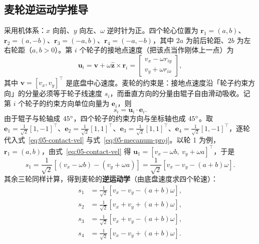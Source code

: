 \subsection{麦轮逆运动学推导}

采用机体系：$x$ 向前、$y$ 向左、$\omega$ 逆时针为正。四个轮心位置为 $\bm{r}_1=(a,b)$、$\bm{r}_2=(a,-b)$、$\bm{r}_3=(-a,b)$、$\bm{r}_4=(-a,-b)$，其中 $2a$ 为前后轮距、$2b$ 为左右轮距（$a,b>0$）。第 $i$ 个轮子的接地点速度（把该点当作刚体上一点）为
\begin{equation}
  \bm{u}_i = \bm{v}+\omega\hat{\bm{z}}\times\bm{r}_i
  = \begin{bmatrix}v_x-\omega r_{iy}\\ v_y+\omega r_{ix}\end{bmatrix},
  \label{eq:05-contact-vel}
\end{equation}
其中 $\bm{v}=[v_x,v_y]^{\top}$ 是底盘中心速度。麦轮的约束是：接地点速度沿「轮子约束方向」的分量必须等于轮子线速度 $s_i$，而垂直方向的分量由辊子自由滑动吸收。记第 $i$ 个轮子的约束方向单位向量为 $\bm{e}_i$，则
\begin{equation}
  s_i = \bm{u}_i\cdot\bm{e}_i.
  \label{eq:05-mecanum-proj}
\end{equation}
由于辊子与轮轴成 $45^\circ$，四个轮子的约束方向与坐标轴也成 $45^\circ$。取 $\bm{e}_1=\frac{1}{\sqrt2}[1,-1]^{\top}$、$\bm{e}_2=\frac{1}{\sqrt2}[1,1]^{\top}$、$\bm{e}_3=\frac{1}{\sqrt2}[1,1]^{\top}$、$\bm{e}_4=\frac{1}{\sqrt2}[1,-1]^{\top}$，逐轮代入式~\eqref{eq:05-contact-vel} 与式~\eqref{eq:05-mecanum-proj}。以轮 1 为例，$\bm{r}_1=(a,b)$，由式~\eqref{eq:05-contact-vel} 得 $\bm{u}_1=[v_x-\omega b,\ v_y+\omega a]^{\top}$，于是
\begin{equation}
  s_1=\frac{1}{\sqrt{2}}\left[(v_x-\omega b)-(v_y+\omega a)\right]
  =\frac{1}{\sqrt{2}}\left[v_x-v_y-(a+b)\omega\right].
\end{equation}
其余三轮同样计算，得到麦轮的\textbf{逆运动学}（由底盘速度求四个轮速）：
\begin{equation}
  \begin{aligned}
    s_1 &= \tfrac{1}{\sqrt{2}}\left[v_x-v_y-(a+b)\omega\right],\\
    s_2 &= \tfrac{1}{\sqrt{2}}\left[v_x+v_y+(a+b)\omega\right],\\
    s_3 &= \tfrac{1}{\sqrt{2}}\left[v_x+v_y-(a+b)\omega\right],\\
    s_4 &= \tfrac{1}{\sqrt{2}}\left[v_x-v_y+(a+b)\omega\right].
  \end{aligned}
  \label{eq:05-mecanum-inv}
\end{equation}

